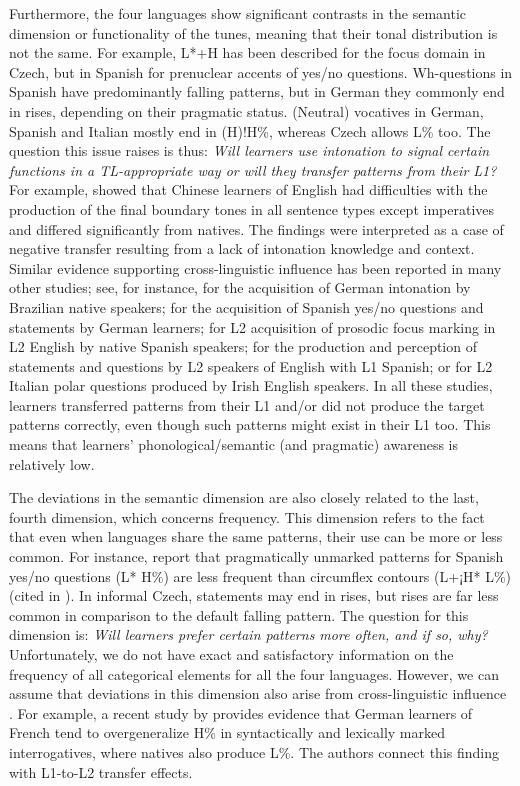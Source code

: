 Furthermore, the four languages show significant contrasts in the semantic dimension or functionality of the tunes, meaning that their tonal distribution is not the same. For example, L*+H has been described for the focus domain in Czech, but in Spanish for prenuclear accents of yes/no questions. Wh-questions in Spanish have predominantly falling patterns, but in German they commonly end in rises, depending on their pragmatic status. (Neutral) vocatives in German, Spanish and Italian mostly end in (H)!H\%, whereas Czech allows L\% too. The question this issue raises is thus: \textit{Will learners use intonation to signal certain functions in a TL-appropriate way or will they transfer patterns from their L1?} For example, \citet{MengWang2009} showed that Chinese learners of English had difficulties with the production of the final boundary tones in all sentence types except imperatives and differed significantly from natives. The findings were interpreted as a case of negative transfer resulting from a lack of intonation knowledge and context. Similar evidence supporting cross-linguistic influence has been reported in many other studies; see, for instance, \citet{Reinecke2003} for the acquisition of German intonation by Brazilian native speakers; \citet{Radel2008} for the acquisition of Spanish yes/no questions and statements by German learners; \citet{NavaZubizarreta2009} for L2 acquisition of prosodic focus marking in L2 English by native Spanish speakers; \citet{ColantoniEtAl2016b} for the production and perception of statements and questions by L2 speakers of English with L1 Spanish; or \citet{NicoraEtAl2018} for L2 Italian polar questions produced by Irish English speakers. In all these studies, learners transferred patterns from their L1 and/or did not produce the target patterns correctly, even though such patterns might exist in their L1 too. This means that learners’ phonological/semantic (and pragmatic) awareness is relatively low.



The deviations in the semantic dimension are also closely related to the last, fourth dimension, which concerns frequency. This dimension refers to the fact that even when languages share the same patterns, their use can be more or less common. For instance, \citet{TorreiraFloyd2012} report that pragmatically unmarked patterns for Spanish yes/no questions (L* H\%) are less frequent than circumflex contours (L+¡H* L\%) (cited in \citealt[374]{HualdePrieto2015}). In informal Czech, statements may end in rises, but rises are far less common in comparison to the default falling pattern. The question for this dimension is: \textit{Will learners prefer certain patterns more often, and if so, why?} Unfortunately, we do not have exact and satisfactory information on the frequency of all categorical elements for all the four languages. However, we can assume that deviations in this dimension also arise from cross-linguistic influence \citep{Mennen2015}. For example, a recent study by \citet{GabrielEtAl2018} provides evidence that German learners of French tend to overgeneralize H\% in syntactically and lexically marked interrogatives, where natives also produce L\%. The authors connect this finding with L1-to-L2 transfer effects.



